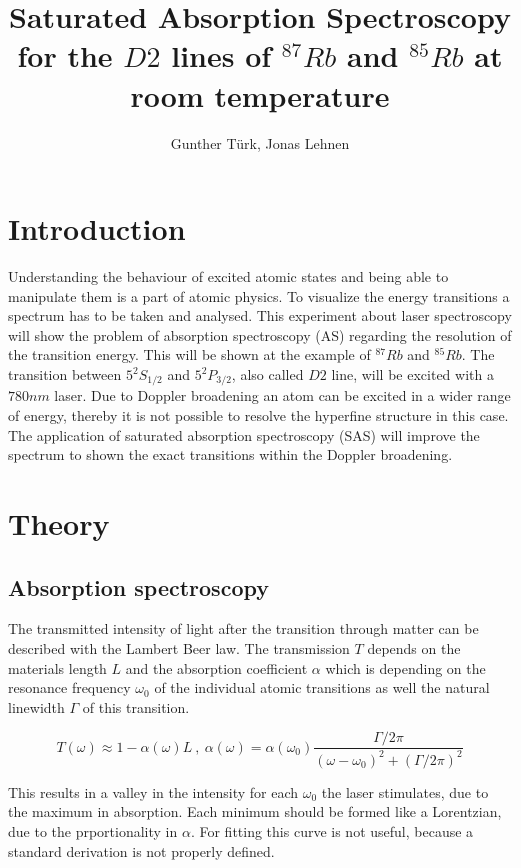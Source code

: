 \documentclass[]{article}
\title{Saturated Absorption Spectroscopy for the $D2$ lines of $^{87}Rb$ and $^{85}Rb$ at room temperature }
\author{Gunther T\"urk, Jonas Lehnen}
\begin{document}
\maketitle
\begin{abstract}


\end{abstract}

\newpage
\tableofcontents

\newpage
\section{Introduction}
Understanding the behaviour of excited atomic states and being able to manipulate them is a part of atomic physics. To visualize the energy transitions a spectrum has to be taken and analysed. 
This experiment about laser spectroscopy will show the problem of absorption spectroscopy (AS) regarding the resolution of the transition energy. This will be shown at the example of $^{87}Rb$ and $^{85}Rb$. The transition between $5^2S_{1/2}$ and $5^2P_{3/2}$, also called $D2$ line, will be excited with a $780nm$ laser. %
Due to Doppler broadening an atom can be excited in a wider range of energy, thereby it is not possible to resolve the hyperfine structure in this case. The application of saturated absorption spectroscopy (SAS) will improve the spectrum to shown the exact transitions within the Doppler broadening.

\newpage
\section{Theory}
\subsection{Absorption spectroscopy}
The transmitted intensity of light after the transition through matter can be described with the Lambert Beer law. The transmission $T$ depends on the materials length $L$ and the absorption coefficient $\alpha$ which is depending on the resonance frequency $\omega_0$ of the individual atomic transitions as well the natural linewidth $\Gamma$ of this transition.

\begin{equation}
T(\omega)\approx 1-\alpha(\omega)L \:,\: \alpha(\omega)= \alpha(\omega_0)\frac{\Gamma/2\pi}{(\omega-\omega_0)^2 + (\Gamma/2\pi)^2}
\end{equation}

This results in a valley in the intensity for each $\omega_0$ the laser stimulates, due to the maximum in absorption. Each minimum should be formed like a Lorentzian, due to the prportionality in $\alpha$. For fitting this curve is not useful, because a standard derivation is not properly defined. 
\end{document}
